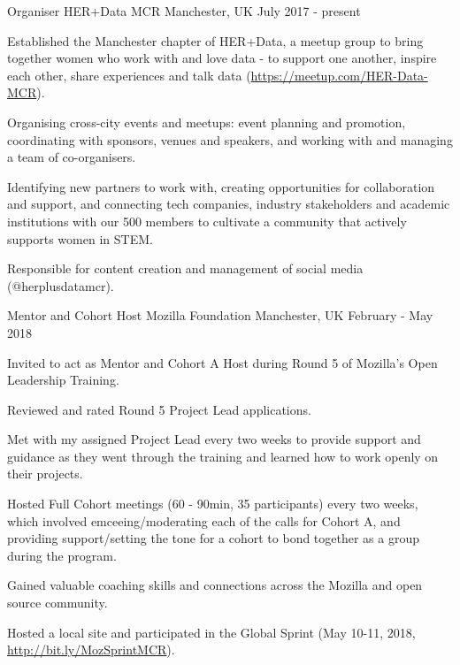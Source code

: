 \begin{cventries}
\cventry
    {Organiser}
    {HER+Data MCR}
    {Manchester, UK}
    {July 2017 - present}
    {
      \begin{cvitems}
        \item {Established the Manchester chapter of HER+Data, a meetup group to bring together women who work with and love data - to support one another, inspire each other, share experiences and talk data (\url{https://meetup.com/HER-Data-MCR}).}
        \item {Organising cross-city events and meetups: event planning and promotion, coordinating with sponsors, venues and speakers, and working with and managing a team of co-organisers.}
        \item {Identifying new partners to work with, creating opportunities for collaboration and support, and connecting tech companies, industry stakeholders and academic institutions with our 500 members to cultivate a community that actively supports women in STEM.}
        \item {Responsible for content creation and management of social media (@herplusdatamcr).}
      \end{cvitems}
    }
\cventry
    {Mentor and Cohort Host}
    {Mozilla Foundation}
    {Manchester, UK}
    {February - May 2018}
    {
      \begin{cvitems}
        \item{Invited to act as Mentor and Cohort A Host during Round 5 of Mozilla's Open Leadership Training.}
        \item{Reviewed and rated Round 5 Project Lead applications.}
        \item{Met with my assigned Project Lead every two weeks to provide support and guidance as they went through the training and learned how to work openly on their projects.}
        \item{Hosted Full Cohort meetings (60 - 90min, 35 participants) every two weeks, which involved emceeing/moderating each of the calls for Cohort A, and providing support/setting the tone for a cohort to bond together as a group during the program.}
        \item{Gained valuable coaching skills and connections across the Mozilla and open source community.}
        \item{Hosted a local site and participated in the Global Sprint (May 10-11, 2018, \url{http://bit.ly/MozSprintMCR}).}
      \end{cvitems}
}
\end{cventries}
